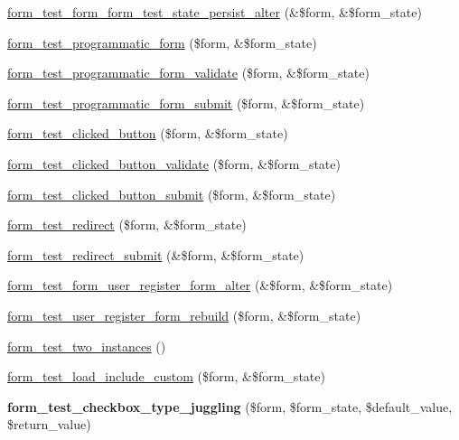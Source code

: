 \begin{DoxyCompactItemize}
\item 
\hyperlink{form__test_8module_a162833daaa3fe9628e839c4e0ac56fde}{form\_\-test\_\-form\_\-form\_\-test\_\-state\_\-persist\_\-alter} (\&\$form, \&\$form\_\-state)
\item 
\hyperlink{form__test_8module_a991b24811c0f2ba4de1f3784f497679e}{form\_\-test\_\-programmatic\_\-form} (\$form, \&\$form\_\-state)
\item 
\hyperlink{form__test_8module_ac397894097fd2b6cbb39612c6c124b93}{form\_\-test\_\-programmatic\_\-form\_\-validate} (\$form, \&\$form\_\-state)
\item 
\hyperlink{form__test_8module_a90c17cc6cf6568ba05771c82e59034d8}{form\_\-test\_\-programmatic\_\-form\_\-submit} (\$form, \&\$form\_\-state)
\item 
\hyperlink{form__test_8module_abd0f05e7f6231b50394fab3668290438}{form\_\-test\_\-clicked\_\-button} (\$form, \&\$form\_\-state)
\item 
\hyperlink{form__test_8module_a5795e527b85244ec38910d4ca9bcd3ba}{form\_\-test\_\-clicked\_\-button\_\-validate} (\$form, \&\$form\_\-state)
\item 
\hyperlink{form__test_8module_aa388c64a1f253abfc751941581b5ce1d}{form\_\-test\_\-clicked\_\-button\_\-submit} (\$form, \&\$form\_\-state)
\item 
\hyperlink{form__test_8module_aeb82e5f085c812b5a993016b064c7c18}{form\_\-test\_\-redirect} (\$form, \&\$form\_\-state)
\item 
\hyperlink{form__test_8module_a42493f9a70b97494aa31111d1f00de64}{form\_\-test\_\-redirect\_\-submit} (\&\$form, \&\$form\_\-state)
\item 
\hyperlink{form__test_8module_a600ce05cfaa9fd8d5f93a89f50778457}{form\_\-test\_\-form\_\-user\_\-register\_\-form\_\-alter} (\&\$form, \&\$form\_\-state)
\item 
\hyperlink{form__test_8module_aae1295d3581a492815c1be8bac66daf3}{form\_\-test\_\-user\_\-register\_\-form\_\-rebuild} (\$form, \&\$form\_\-state)
\item 
\hyperlink{form__test_8module_a38491ab9e989867fe1f2ced9691fbccd}{form\_\-test\_\-two\_\-instances} ()
\item 
\hyperlink{form__test_8module_a0f5e4a794bf7e1e8ff6de2d77ba02871}{form\_\-test\_\-load\_\-include\_\-custom} (\$form, \&\$form\_\-state)
\item 
\hypertarget{form__test_8module_a6e02448d827337014c3091c199612133}{
{\bfseries form\_\-test\_\-checkbox\_\-type\_\-juggling} (\$form, \$form\_\-state, \$default\_\-value, \$return\_\-value)}
\label{form__test_8module_a6e02448d827337014c3091c199612133}


\end{DoxyCompactItemize}
